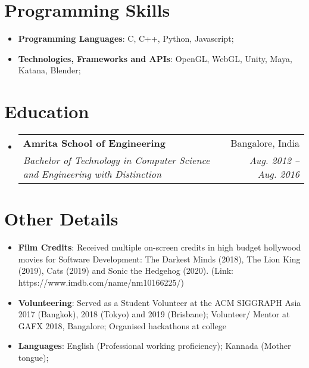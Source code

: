 \documentclass[a4paper,11pt]{article}
\makeatletter
\newcommand{\resumeItem}[2]{
  \item\small{
    \textbf{#1}{: #2 \vspace{-2pt}}
  }
}
\newcommand{\resumeSubheading}[4]{
  \vspace{-1pt}\item
    \begin{tabular*}{0.97\textwidth}[t]{l@{\extracolsep{\fill}}r}
      \textbf{#1} & #2 \\
      \textit{\small#3} & \textit{\small #4} \\
    \end{tabular*}
    \vspace{-5pt}
}
\newcommand{\resumeSubItem}[2]{
  \resumeItem{#1}{#2}
  \vspace{-4pt}
}
\newcommand{\resumeSubHeadingListStart}{
  \begin{itemize}[leftmargin=*]
}
\newcommand{\resumeSubHeadingListEnd}{
  \end{itemize}
}
\makeatother
\begin{document}
  \section{Programming  Skills}
    \resumeSubHeadingListStart
      \resumeSubItem{Programming Languages}
        {C, C++, Python, Javascript;}
      \resumeSubItem{Technologies, Frameworks and APIs}
        {OpenGL, WebGL, Unity, Maya, Katana, Blender;}
    \resumeSubHeadingListEnd

  \section{Education}
    \resumeSubHeadingListStart

      \resumeSubheading
        {Amrita School of Engineering}{Bangalore, India}
        {Bachelor of Technology in Computer Science and Engineering with Distinction}{Aug. 2012 -- Aug. 2016}
    \resumeSubHeadingListEnd

  \section{Other Details}
    \resumeSubHeadingListStart
      \resumeSubItem{Film Credits}
        {Received multiple on-screen credits in high budget hollywood movies for Software Development: The Darkest Minds (2018), The Lion King (2019), Cats (2019) and Sonic the Hedgehog (2020). (Link: https://www.imdb.com/name/nm10166225/)}
      \resumeSubItem{Volunteering}
        {Served as a Student Volunteer at the ACM SIGGRAPH Asia 2017 (Bangkok), 2018 (Tokyo) and 2019 (Brisbane);
          Volunteer/ Mentor at GAFX 2018, Bangalore;
          Organised hackathons at college}
      \resumeSubItem{Languages}
        {English (Professional working proficiency); Kannada (Mother tongue);}
    \resumeSubHeadingListEnd

\end{document}
